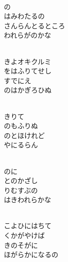 \documentclass[10pt,b5j]{tarticle} %
\begin{document}
\begin{enumerate}
\begin{minipage}[c]{\blocksize}
        \vspace{\linespace}
        \item~\\
        の\\
        はみわたるの\\
        さんらんとるところ\\
        われらがのかな
        
        \vspace{\linespace}
        \item~\\
        きよオキクルミ\\
        をはふりてせし\\
        すでにえ\\
        のはかぎろひぬ
        
        \vspace{\linespace}
        \item~\\
        きりて\\
        のもふりぬ\\
        のとほけれど\\
        やにるらん
        
        \vspace{\linespace}
        \item~\\
        のに\\
        とのかざし\\
        りむすぶの\\
        はきわれらかな
        
        \vspace{\linespace}
        \item~\\
        こよひにはちて\\
        くかがやけば\\
        きのそがに\\
        ほがらかになるの
        

\end{minipage}
\end{enumerate}
\end{document}
